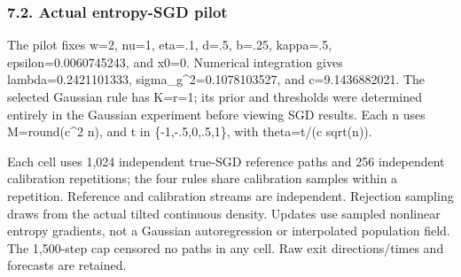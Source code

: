 \subsubsection{7.2. Actual entropy-SGD
pilot}\label{gaussian_results-actual-entropy-sgd-pilot}

The pilot fixes w=2, nu=1, eta=.1, d=.5, b=.25, kappa=.5,
epsilon=0.0060745243, and x0=0. Numerical integration gives
lambda=0.2421101333, sigma\_g\^{}2=0.1078103527, and c=9.1436882021. The
selected Gaussian rule has K=r=1; its prior and thresholds were
determined entirely in the Gaussian experiment before viewing SGD
results. Each n uses M=round(c\^{}2 n), and t in \{-1,-.5,0,.5,1\}, with
theta=t/(c sqrt(n)).

Each cell uses 1,024 independent true-SGD reference paths and 256
independent calibration repetitions; the four rules share calibration
samples within a repetition. Reference and calibration streams are
independent. Rejection sampling draws from the actual tilted continuous
density. Updates use sampled nonlinear entropy gradients, not a Gaussian
autoregression or interpolated population field. The 1,500-step cap
censored no paths in any cell. Raw exit directions/times and forecasts
are retained.

